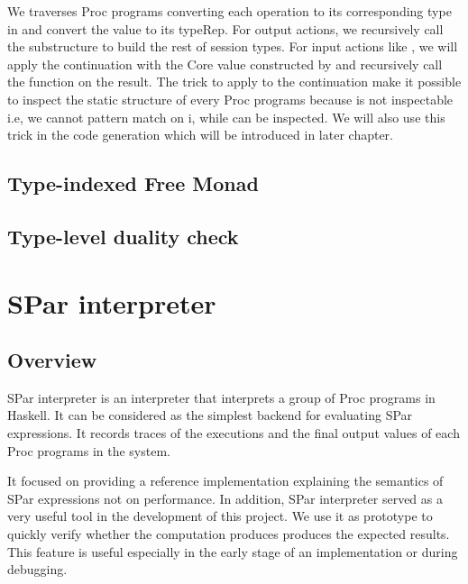 We traverses Proc programs converting each operation to its corresponding type in  and convert the value to its typeRep. For output actions, we recursively call the substructure to build the rest of session types. For input actions like , we will apply the continuation with the Core value constructed by and recursively call the function on the result. The trick to apply  to the continuation make it possible to inspect the static structure of every Proc programs because  is not inspectable i.e, we cannot pattern match on i, while  can be inspected. We will also use this trick in the code generation which will be introduced in later chapter.
\subsection{Type-indexed Free Monad}
\subsection{Type-level duality check}
\section{SPar interpreter} \label{impl:sec:interp}
\subsection{Overview}
SPar interpreter is an interpreter that interprets a group of Proc programs in Haskell. It can be considered as the simplest backend for evaluating SPar expressions. It records traces of the executions and the final output values of each Proc programs in the system. 

It focused on providing a reference implementation explaining the semantics of SPar expressions not on performance. In addition, SPar interpreter served as a very useful tool in the development of this project. We use it as prototype to quickly verify whether the computation produces produces the expected results. This feature is useful especially in the early stage of an implementation or during debugging.
